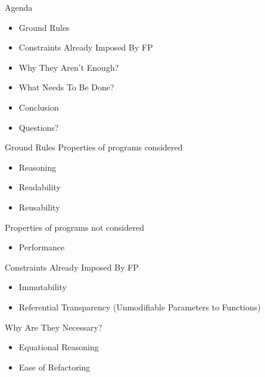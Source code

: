 \documentclass[bigger]{beamer}
\begin{document}
\begin{frame}{Agenda}
  \begin{itemize}
  \item Ground Rules
  \item Constraints Already Imposed By FP
  \item Why They Aren't Enough?
  \item What Needs To Be Done?
  \item Conclusion
  \item Questions?
  \end{itemize}
\end{frame}

\begin{frame}{Ground Rules}
  Properties of programs considered
  \begin{itemize}
  \item Reasoning
  \item Readability
  \item Reusability
  \end{itemize}
  Properties of programs not considered
  \begin{itemize}
  \item Performance
  \end{itemize}
\end{frame}

\begin{frame}{Constraints Already Imposed By FP}
  \begin{itemize}
  \item Immutability
  \item Referential Transparency (Unmodifiable Parameters to Functions)
  \end{itemize}
\end{frame}

\begin{frame}{Why Are They Necessary?}
  \begin{itemize}
  \item Equational Reasoning
  \item Ease of Refactoring
  \end{itemize}
\end{frame}
\end{document}
